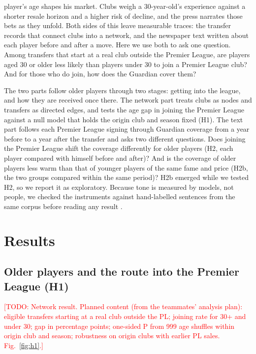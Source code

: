 \documentclass[9pt,twocolumn,twoside]{pnas-new}
\newcommand{\todo}[1]{\textcolor{red}{[TODO: #1]}}
\begin{document}

\maketitle
\thispagestyle{firststyle}

 player's age shapes his market. Clubs weigh a 30-year-old's experience against a shorter resale horizon and a higher risk of decline, and the press narrates those bets as they unfold. Both sides of this leave measurable traces: the transfer records that connect clubs into a network, and the newspaper text written about each player before and after a move. Here we use both to ask one question. Among transfers that start at a real club outside the Premier League, are players aged 30 or older less likely than players under 30 to join a Premier League club? And for those who do join, how does the Guardian cover them?

The two parts follow older players through two stages: getting into the league, and how they are received once there. The network part treats clubs as nodes and transfers as directed edges, and tests the age gap in joining the Premier League against a null model that holds the origin club and season fixed (H1). The text part follows each Premier League signing through Guardian coverage from a year before to a year after the transfer and asks two different questions. Does joining the Premier League shift the coverage differently for older players (H2, each player compared with himself before and after)? And is the coverage of older players less warm than that of younger players of the same fame and price (H2b, the two groups compared within the same period)? H2b emerged while we tested H2, so we report it as exploratory. Because tone is measured by models, not people, we checked the instruments against hand-labelled sentences from the same corpus before reading any result \cite{jurafsky2025slp}.

\section*{Results}

\subsection*{Older players and the route into the Premier League (H1)}
\todo{Network result. Planned content (from the teammates' analysis plan): eligible transfers starting at a real club outside the PL; joining rate for 30+ and under 30; gap in percentage points; one-sided P from 999 age shuffles within origin club and season; robustness on origin clubs with earlier PL sales. Fig.~\ref{fig:h1}.}
\end{document}
